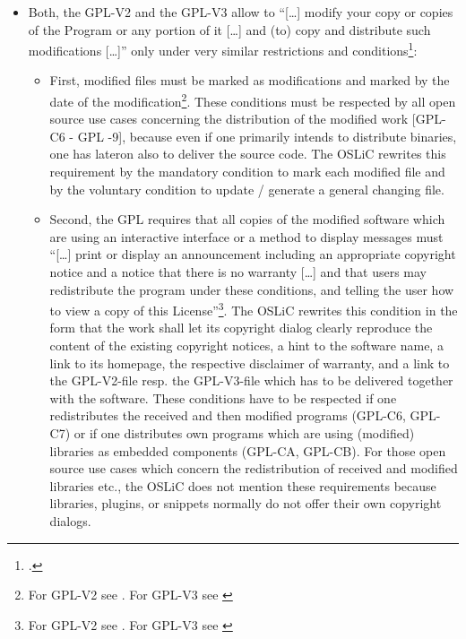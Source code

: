 \begin{itemize}
  \item Both, the GPL-V2 and the GPL-V3 allow to \enquote{[\ldots] modify your
  copy or copies of the Program or any portion of it [\ldots] and (to) copy and
  distribute such modifications [\ldots]} only under very similar restrictions
  and conditions\footcite[cf.][\nopage wp.\ §2]{Gpl20OsiLicense1991a}:
  \begin{itemize}
    \item First, modified files must be marked as modifications and marked by
    the date of the modification\footnote{For GPL-V2 see \cite[cf.][\nopage wp.\
    §2]{Gpl20OsiLicense1991a}. For GPL-V3 see \cite[cf.][\nopage wp.\
    §5]{Gpl30OsiLicense2007a}}. These conditions must be respected by all open
    source use cases concerning the distribution of the modified work [GPL-C6 -
    GPL -9], because even if one primarily intends to distribute binaries, one
    has lateron also to deliver the source code. The OSLiC rewrites this
    requirement by the mandatory condition to mark each modified file and by the
    voluntary condition to update / generate a general changing file.
    
    \item Second, the GPL requires that all copies of the modified software
    which are using an interactive interface or a method to display messages
    must \enquote{[\ldots] print or display an announcement including an
    appropriate copyright notice and a notice that there is no warranty [\ldots]
    and that users may redistribute the program under these conditions, and
    telling the user how to view a copy of this License}\footnote{For GPL-V2
    see \cite[cf.][\nopage wp.\ §2c]{Gpl20OsiLicense1991a}. For GPL-V3 see
    \cite[cf.][\nopage wp.\ §5d]{Gpl30OsiLicense2007a}}. The OSLiC rewrites this
    condition in the form that the work shall let its copyright dialog clearly
    reproduce the content of the existing copyright notices, a hint to the
    software name, a link to its homepage, the respective disclaimer of
    warranty, and a link to the GPL-V2-file resp. the GPL-V3-file which has to
    be delivered together with the software. These conditions have to be
    respected if one redistributes the received and then modified programs
    (GPL-C6, GPL-C7) or if one distributes own programs which are using (modified)
    libraries as embedded components (GPL-CA, GPL-CB). For those open source use
    cases which concern the redistribution of  received and modified libraries
    etc., the OSLiC does not mention these requirements because libraries,
    plugins, or snippets normally do not offer their own copyright dialogs.
    

\end{itemize}
\end{itemize}
